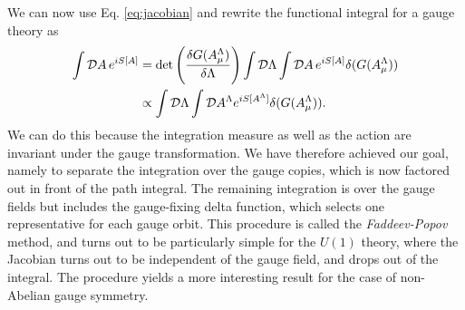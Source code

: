 \documentclass{article}
\numberwithin{equation}{section}
\begin{document}
We can now use Eq. \ref{eq:jacobian} and rewrite the functional integral for a gauge theory as 
\begin{equation}
\begin{aligned}
    \int \mathcal{D}A\, e^{iS[A]} &= \det\left(\fdv{G(A_\mu^\Lambda)}{\Lambda}\right) \int \mathcal{D}\Lambda \int \mathcal{D} A \, e^{iS[A]} \delta(G(A_\mu^\Lambda)) \\
    & \propto \int \mathcal{D}\Lambda \int \mathcal{D}A^\Lambda e^{iS[A^\Lambda]} \delta(G(A_\mu^\Lambda)).
\end{aligned}
\end{equation}
We can do this because the integration measure as well as the action are invariant under the gauge transformation.
We have therefore achieved our goal, namely to separate the integration over the gauge copies, which is now factored out in front of the path integral. The remaining integration is over the gauge fields but includes the gauge-fixing delta function, which selects one representative for each gauge orbit. This procedure is called the \textit{Faddeev-Popov} method, and turns out to be particularly simple for the $U(1)$ theory, where the Jacobian turns out to be independent of the gauge field, and drops out of the integral. The procedure yields a more interesting result for the case of non-Abelian gauge symmetry. 
\end{document}

